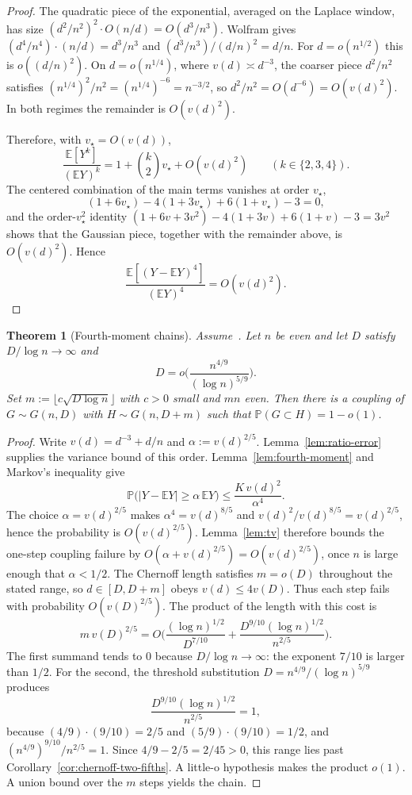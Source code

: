 \documentclass[11pt]{article}
\newtheorem{theorem}{Theorem}
\newcommand{\EE}{\mathbb{E}}
\newcommand{\PP}{\mathbb{P}}
\begin{document}
\begin{proof}
The quadratic piece of the exponential, averaged on the Laplace window, has size
\((d^2/n^2)^2\cdot O(n/d)=O(d^3/n^3)\).
Wolfram gives \((d^4/n^4)\cdot(n/d)=d^3/n^3\) and
\((d^3/n^3)/(d/n)^2=d/n\).
For \(d=o(n^{1/2})\) this is \(o((d/n)^2)\). On \(d=o(n^{1/4})\), where
\(v(d)\asymp d^{-3}\), the coarser piece \(d^2/n^2\) satisfies
\((n^{1/4})^2/n^2=(n^{1/4})^{-6}=n^{-3/2}\), so \(d^2/n^2=O(d^{-6})=O(v(d)^2)\).
In both regimes the remainder is \(O(v(d)^2)\).

Therefore, with \(v_\star=O(v(d))\),
\[
\frac{\EE[Y^k]}{(\EE Y)^k}
=
1+\binom{k}{2}v_\star+O(v(d)^2)
\qquad(k\in\{2,3,4\}).
\]
The centered combination of the main terms vanishes at order \(v_\star\),
\[
(1+6v_\star)-4(1+3v_\star)+6(1+v_\star)-3=0,
\]
and the order-\(v_\star^2\) identity
\((1+6v+3v^2)-4(1+3v)+6(1+v)-3=3v^2\)
shows that the Gaussian piece, together with the remainder above, is
\(O(v(d)^2)\). Hence
\[
\frac{\EE[(Y-\EE Y)^4]}{(\EE Y)^4}=O(v(d)^2).
\]
\end{proof}

\begin{theorem}[Fourth-moment chains]
\label{thm:fourth-chains}
Assume~\cite[Theorem~6]{Gao20}.
Let \(n\) be even and let \(D\) satisfy \(D/\log n\to\infty\) and
\[
D=o\Biggl(\frac{n^{4/9}}{(\log n)^{5/9}}\Biggr).
\]
Set \(m:=\lfloor c\sqrt{D\log n}\rfloor\) with \(c>0\) small and \(mn\) even.
Then there is a coupling of \(G\sim G(n,D)\) with \(H\sim G(n,D+m)\) such that
\(\PP(G\subset H)=1-o(1)\).
\end{theorem}

\begin{proof}
Write \(v(d)=d^{-3}+d/n\) and \(\alpha:=v(d)^{2/5}\).
Lemma~\ref{lem:ratio-error} supplies the variance bound of this order.
Lemma~\ref{lem:fourth-moment} and Markov's inequality give
\[
\PP\bigl(|Y-\EE Y|\ge\alpha\,\EE Y\bigr)
\le
\frac{K\,v(d)^2}{\alpha^4}.
\]
The choice \(\alpha=v(d)^{2/5}\) makes \(\alpha^4=v(d)^{8/5}\) and
\(v(d)^2/v(d)^{8/5}=v(d)^{2/5}\), hence the probability is \(O(v(d)^{2/5})\).
Lemma~\ref{lem:tv} therefore bounds the one-step coupling failure by
\(O(\alpha+v(d)^{2/5})=O(v(d)^{2/5})\), once \(n\) is large enough that \(\alpha<1/2\).
The Chernoff length satisfies \(m=o(D)\) throughout the stated range, so
\(d\in[D,D+m]\) obeys \(v(d)\le 4v(D)\).
Thus each step fails with probability \(O(v(D)^{2/5})\).
The product of the length with this cost is
\[
m\,v(D)^{2/5}
=O\Biggl(
\frac{(\log n)^{1/2}}{D^{7/10}}
+
\frac{D^{9/10}(\log n)^{1/2}}{n^{2/5}}
\Biggr).
\]
The first summand tends to \(0\) because \(D/\log n\to\infty\): the exponent
\(7/10\) is larger than \(1/2\).
For the second, the threshold substitution \(D=n^{4/9}/(\log n)^{5/9}\) produces
\[
\frac{D^{9/10}(\log n)^{1/2}}{n^{2/5}}
=1,
\]
because \((4/9)\cdot(9/10)=2/5\) and \((5/9)\cdot(9/10)=1/2\), and
\((n^{4/9})^{9/10}/n^{2/5}=1\).
Since \(4/9-2/5=2/45>0\), this range lies past
Corollary~\ref{cor:chernoff-two-fifths}.
A little-o hypothesis makes the product \(o(1)\). A union bound over the \(m\) steps
yields the chain.
\end{proof}
\end{document}
